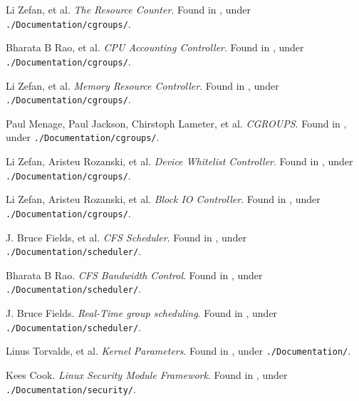\begin{thebibliography}{9}

Li Zefan, et al.  \emph{The Resource Counter}. Found in
\cite{linux-kernel-v3.14.2}, under \texttt{./Documentation/cgroups/}.


Bharata B Rao, et al. \emph{CPU Accounting Controller}.  Found in
\cite{linux-kernel-v3.14.2}, under \texttt{./Documentation/cgroups/}.


Li Zefan, et al.  \emph{Memory Resource Controller}. Found in
\cite{linux-kernel-v3.14.2}, under \texttt{./Documentation/cgroups/}.


Paul Menage, Paul Jackson, Chirstoph Lameter, et al. \emph{CGROUPS}.  Found in
\cite{linux-kernel-v3.14.2}, under \texttt{./Documentation/cgroups/}.


Li Zefan, Aristeu Rozanski, et al. \emph{Device Whitelist Controller}.  Found
in \cite{linux-kernel-v3.14.2}, under \texttt{./Documentation/cgroups/}.


Li Zefan, Aristeu Rozanski, et al. \emph{Block IO Controller}.  Found
in \cite{linux-kernel-v3.14.2}, under \texttt{./Documentation/cgroups/}.



J. Bruce Fields, et al. \emph{CFS Scheduler}.  Found in
\cite{linux-kernel-v3.14.2}, under \texttt{./Documentation/scheduler/}.


Bharata B Rao. \emph{CFS Bandwidth Control}.  Found in
\cite{linux-kernel-v3.14.2}, under \texttt{./Documentation/scheduler/}.


J. Bruce Fields. \emph{Real-Time group scheduling}.  Found in
\cite{linux-kernel-v3.14.2}, under \texttt{./Documentation/scheduler/}.


Linus Torvalds, et al. \emph{Kernel Parameters}. Found in
\cite{linux-kernel-v3.14.2}, under \texttt{./Documentation/}.


Kees Cook. \emph{Linux Security Module Framework}. Found in
\cite{linux-kernel-v3.14.2}, under \texttt{./Documentation/security/}.

\end{thebibliography}
